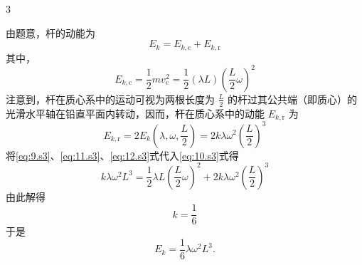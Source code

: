 \begin{solution}{3}
\begin{subsolution}
由题意，杆的动能为
\begin{equation}
E_{k} = E_{k,\mathrm{c}} + E_{k,\mathrm{r}}
\label{eq:10.s3}
\end{equation}
其中，
\begin{equation}
E_{k,\mathrm{c}} = \frac{1}{2} m v_{\mathrm{c}}^{2} = \frac{1}{2} (\lambda L) \left(\frac{L}{2} \omega\right)^{2}
\label{eq:11.s3}
\end{equation}
注意到，杆在质心系中的运动可视为两根长度为 $\frac{L}{2}$ 的杆过其公共端（即质心）的光滑水平轴在铅直平面内转动，因而，杆在质心系中的动能 $E_{k,\mathrm{r}}$ 为
\begin{equation}
E_{k,\mathrm{r}} = 2 E_{k}(\lambda, \omega, \frac{L}{2}) = 2 k \lambda \omega^{2} \left(\frac{L}{2}\right)^{3}
\label{eq:12.s3}
\end{equation}
将\eqref{eq:9.s3}、\eqref{eq:11.s3}、\eqref{eq:12.s3}式代入\eqref{eq:10.s3}式得
\begin{equation}
k \lambda \omega^{2} L^{3} = \frac{1}{2} \lambda L \left(\frac{L}{2} \omega\right)^{2} + 2 k \lambda \omega^{2} \left(\frac{L}{2}\right)^{3}
\label{eq:13.s3}
\end{equation}
由此解得
\begin{equation}
k = \frac{1}{6}
\label{eq:14.s3}
\end{equation}
于是
\begin{equation}
E_{k} = \frac{1}{6} \lambda \omega^{2} L^{3}.
\label{eq:15.s3}
\end{equation}
\end{subsolution}


\end{solution}
